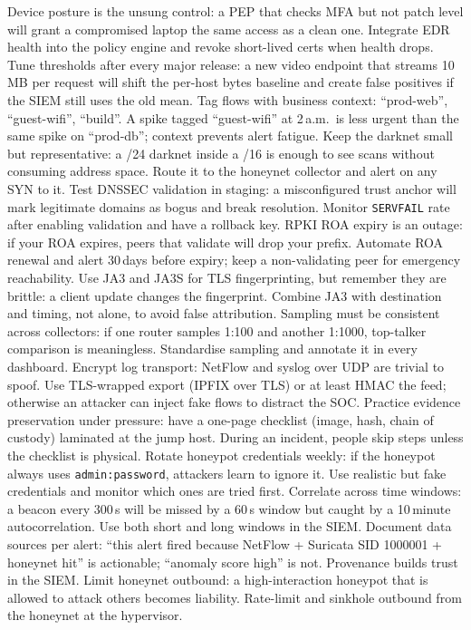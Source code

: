 Device posture is the unsung control: a PEP that checks MFA but not patch level will grant a compromised laptop the same access as a clean one. Integrate EDR health into the policy engine and revoke short-lived certs when health drops.
Tune thresholds after every major release: a new video endpoint that streams 10\,MB per request will shift the per-host bytes baseline and create false positives if the SIEM still uses the old mean.
Tag flows with business context: ``prod-web'', ``guest-wifi'', ``build''. A spike tagged ``guest-wifi'' at 2\,a.m.\ is less urgent than the same spike on ``prod-db''; context prevents alert fatigue.
Keep the darknet small but representative: a /24 darknet inside a /16 is enough to see scans without consuming address space. Route it to the honeynet collector and alert on any SYN to it.
Test DNSSEC validation in staging: a misconfigured trust anchor will mark legitimate domains as bogus and break resolution. Monitor \texttt{SERVFAIL} rate after enabling validation and have a rollback key.
RPKI ROA expiry is an outage: if your ROA expires, peers that validate will drop your prefix. Automate ROA renewal and alert 30\,days before expiry; keep a non-validating peer for emergency reachability.
Use JA3 and JA3S for TLS fingerprinting, but remember they are brittle: a client update changes the fingerprint. Combine JA3 with destination and timing, not alone, to avoid false attribution.
Sampling must be consistent across collectors: if one router samples 1:100 and another 1:1000, top-talker comparison is meaningless. Standardise sampling and annotate it in every dashboard.
Encrypt log transport: NetFlow and syslog over UDP are trivial to spoof. Use TLS-wrapped export (IPFIX over TLS) or at least HMAC the feed; otherwise an attacker can inject fake flows to distract the SOC.
Practice evidence preservation under pressure: have a one-page checklist (image, hash, chain of custody) laminated at the jump host. During an incident, people skip steps unless the checklist is physical.
Rotate honeypot credentials weekly: if the honeypot always uses \texttt{admin:password}, attackers learn to ignore it. Use realistic but fake credentials and monitor which ones are tried first.
Correlate across time windows: a beacon every 300\,s will be missed by a 60\,s window but caught by a 10\,minute autocorrelation. Use both short and long windows in the SIEM.
Document data sources per alert: ``this alert fired because NetFlow + Suricata SID 1000001 + honeynet hit'' is actionable; ``anomaly score high'' is not. Provenance builds trust in the SIEM.
Limit honeynet outbound: a high-interaction honeypot that is allowed to attack others becomes liability. Rate-limit and sinkhole outbound from the honeynet at the hypervisor.
